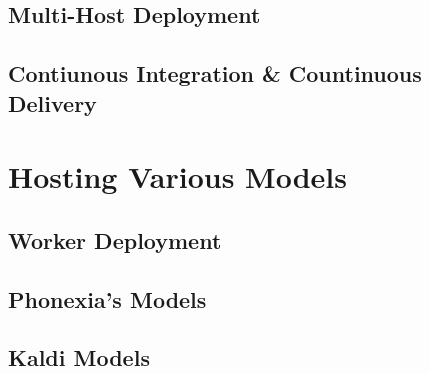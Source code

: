 \subsection{Multi-Host Deployment}
\blindtext

\subsection{Contiunous Integration \& Countinuous Delivery}
\blindtext


\section{Hosting Various Models}
\blindtext

\subsection{Worker Deployment}
\blindtext
\blindtext

\subsection{Phonexia's Models}
\blindtext

\subsection{Kaldi Models}
\blindtext
